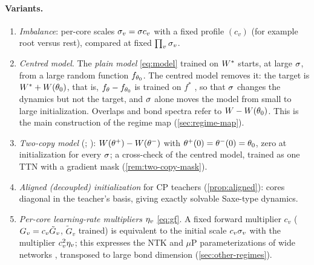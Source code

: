 \paragraph{Variants.}
\begin{enumerate}[label=(\alph*)]
  \item \emph{Imbalance}: per-core scales $\sigma_{v}=\sigma c_v$ with a fixed profile $(c_v)$ (for
    example root versus rest), compared at fixed $\prod_v\sigma_{v}$.
  \item \emph{Centred model}. The \emph{plain model} \eqref{eq:model} trained on $W^{*}$ starts, at
    large $\sigma$, from a large random function $f_{\theta_0}$. The centred model removes it: the
    target is $W^{*}+W(\theta_0)$, that is, $f_\theta-f_{\theta_0}$ is trained on $f^*$
    \citep[Sec.~3.2]{chizat2019lazy}, so that $\sigma$ changes the dynamics but not the target, and
    $\sigma$ alone moves the model from small to large initialization. Overlaps and bond spectra refer
    to $W-W(\theta_0)$. This is the main construction of the regime map (\cref{sec:regime-map}).
  \item \emph{Two-copy model} (\citealp[Sec.~3.1]{chizat2019lazy};
    \citealp[Sec.~4]{woodworth2020kernel}): $W(\theta^+)-W(\theta^-)$ with
    $\theta^+(0)=\theta^-(0)=\theta_0$, zero at initialization for every $\sigma$; a cross-check of
    the centred model, trained as one TTN with a gradient mask (\cref{rem:two-copy-mask}).
  \item \emph{Aligned (decoupled) initialization} for CP teachers (\cref{prop:aligned}): cores
    diagonal in the teacher's basis, giving exactly solvable Saxe-type dynamics.
  \item \emph{Per-core learning-rate multipliers} $\eta_{v}$ \eqref{eq:gf}. A fixed
    forward multiplier $c_v$ ($G_{v}=c_v\tilde G_v$, $\tilde G_v$ trained) is equivalent to the
    initial scale $c_v\sigma_{v}$ with the multiplier $c_v^2\eta_{v}$; this expresses the NTK and $\mu$P
    parameterizations of wide networks \citep{yang2021tensor}, transposed to large bond dimension
    (\cref{sec:other-regimes}).
\end{enumerate}

